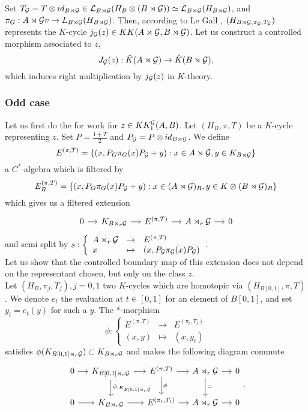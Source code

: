 Set $T_\mathcal G= T\otimes id_{B\rtimes \mathcal G}\in \mathcal L_{B\rtimes \mathcal G}(H_B\otimes (B\rtimes \mathcal G))\simeq \mathcal L_{B\rtimes \mathcal G}(H_{B\rtimes\mathcal G})$, and $\pi_G: A\rtimes \mathcal G v\rightarrow L_{B\rtimes \mathcal G}(H_{B\rtimes\mathcal G})$. Then, according to Le Gall \cite{LeGall}, $(H_{B\rtimes\mathcal G, \pi_\mathcal G, T_\mathcal G})$ represents the $K$-cycle $j_\mathcal G(z)\in KK(A\rtimes \mathcal G,B\rtimes \mathcal G)$. Let us construct a controlled morphism associated to $z$,
\[J_\mathcal G(z) : \hat K(A\rtimes \mathcal G)\rightarrow \hat K(B\rtimes\mathcal G), \]
which induces right multiplication by $j_\mathcal G(z)$ in $K$-theory.\\

\subsubsection{Odd case}

Let us first do the for work for $z\in KK_1^\mathcal G(A,B)$. Let $(H_B,\pi,T)$ be a $K$-cycle representing $z$. Set $P=\frac{1+T}{2}$ and $P_\mathcal G=P\otimes id_{B\rtimes \mathcal G}$. We define
\[E^{(\pi,T)}=\{(x,P_G\pi_G(x)P_\mathcal G + y) : x\in A\rtimes \mathcal G, y\in K_{B\rtimes\mathcal G}\}\]
a $C^*$-algebra which is filtered by
\[E_R^{(\pi,T)}=\{(x,P_G\pi_G(x)P_\mathcal G + y) : x\in (A\rtimes \mathcal G)_R, y\in K\otimes (B\rtimes\mathcal G)_R\}\]
which gives us a filtered extension
\[\begin{tikzcd}[column sep = small]
0\arrow{r} & K_{B\rtimes_r\G}\arrow{r} & E^{(\pi,T)} \arrow{r} & A\rtimes_r \G \arrow{r}& 0
\end{tikzcd}\]
and semi split by  $s :\left\{\begin{array}{lll}A\rtimes_r \mathcal G & \rightarrow & E^{(\pi,T)} \\ x & \mapsto & (x, P_\mathcal G \pi_\mathcal G(x)P_\mathcal G)\end{array}\right.$.\\

Let us show that the controlled boundary map of this extension does not depend on the representant chosen, but only on the class $z$.\\
Let $(H_B, \pi_j,T_j), j=0,1$ two $K$-cycles which are homotopic via $(H_{B[0,1]},\pi,T)$. We denote $e_t$ the evaluation at $t\in[0,1]$ for an element of $B[0,1]$, and set $y_t=e_t(y)$ for such a $y$. The $*$-morphism
\[\phi : \left\{\begin{array}{lll}E^{(\pi,T)} & \rightarrow & E^{(\pi_t,T_t)} \\ (x,y) & \mapsto & (x, y_t)\end{array}\right.\]
satisfies $\phi(K_{B[0,1] \rtimes_r \mathcal G})\subset K_{B \rtimes_r \mathcal G}$ and makes the following diagram commute
\[\begin{tikzcd}[column sep = small]
0\arrow{r} & K_{B[0,1] \rtimes_r \G}\arrow{r}\arrow{d}{\phi_{|K_{B[0,1] \rtimes_r \G}}} & E^{(\pi,T)} \arrow{r}\arrow{d}{\phi} & A\rtimes_r \G \arrow{r}\arrow{d}{=}& 0 \\
0\arrow{r} & K_{B \rtimes_r \G}\arrow{r} &  E^{(\pi_t,T_t)} \arrow{r} & A\rtimes_r \G \arrow{r} & 0
\end{tikzcd}.\]

